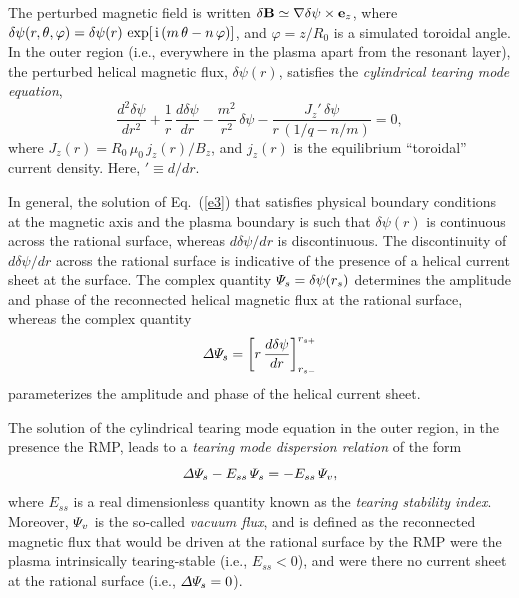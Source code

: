 \documentclass[12pt,prb,aps]{revtex4-1}
\begin{document}
The perturbed magnetic field is written $\delta{\bf B} \simeq \nabla\delta\psi\times{\bf e}_z$,  
where
$\delta\psi(r,\theta,\varphi)= \delta\psi(r)\,\exp[\,{\rm i}\,(m\,\theta-n\,\varphi)]$, 
and $\varphi=z/R_0$ is a simulated toroidal angle. 
In the outer region  (i.e., everywhere in the plasma
apart from the resonant layer), the perturbed helical magnetic flux, $\delta\psi(r)$, satisfies the
{\em cylindrical tearing mode equation},\cite{ric3,cyl,wes}
\begin{equation}\label{e3}
\frac{d^2 \delta\psi}{d r^2} + \frac{1}{r}\,\frac{d \delta\psi}{dr}-\frac{m^2}{r^2}\,\delta\psi - \frac{J_z'\,\delta\psi}{r\,(1/q-n/m)}=  0,
\end{equation}
where 
$J_z(r)= R_0\,\mu_0\,j_z(r)/B_z$,
and $j_z(r)$ is the equilibrium ``toroidal'' current density. Here, $'\equiv d/dr$. 

In general, the solution of Eq.~(\ref{e3}) that satisfies physical
boundary conditions at the magnetic axis and the plasma boundary is such that $\delta\psi(r)$ is continuous
across the rational surface, whereas $d\delta\psi/dr$ is discontinuous. The discontinuity of
 $d\delta\psi/dr$ across the rational surface is indicative of the presence of a helical current
 sheet at the surface.  The complex quantity ${\mit\Psi}_s= \delta\psi(r_s)$ determines the amplitude
 and phase of the reconnected helical magnetic flux at the rational surface, whereas the complex quantity 
 \begin{equation}
{\mit\Delta\Psi}_{\!s} = \left[r\,\frac{d\delta\psi}{dr}\right]_{r_{s-}}^{r_{s+}}
\end{equation}
parameterizes the amplitude and phase of the helical current sheet.\cite{rf1993}

The solution of
the cylindrical tearing mode equation in the outer region, in the presence the RMP,  leads to a {\em tearing mode dispersion relation}\/ of the form\,\cite{rf1993,fkr}
\begin{equation}\label{e110}
{\mit\Delta\Psi}_{\!s}- E_{ss}\,{\mit\Psi}_s = -E_{ss}\,{\mit\Psi}_v,
\end{equation}
where $E_{ss}$ is a real dimensionless quantity known as the {\em tearing stability index}.\cite{fkr} Moreover,
${\mit\Psi}_v$ is the so-called {\em vacuum flux}, and is defined as the reconnected magnetic flux
that would be driven at the rational surface by the RMP were the
plasma intrinsically tearing-stable (i.e., $E_{ss} <0$), and were there no current sheet at the rational surface
(i.e., ${\mit\Delta\Psi}_{\!s}=0$).\cite{rf1993} 
\end{document}
